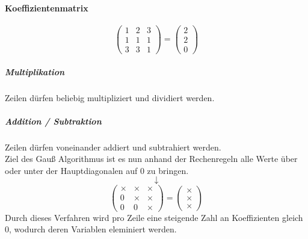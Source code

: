\documentclass{school}
\begin{document}
\paragraph{Koeffizientenmatrix}
$$
\begin{pmatrix}
1 & 2 & 3\\
1 & 1 & 1\\
3 & 3 & 1
\end{pmatrix} =
\begin{pmatrix}
2\\2\\0
\end{pmatrix}
$$
\subparagraph{Multiplikation}
Zeilen dürfen beliebig multipliziert und dividiert werden.
\subparagraph{Addition / Subtraktion}
Zeilen dürfen voneinander addiert und subtrahiert werden.
\vspace{1 em}\\
Ziel des Gauß Algorithmus ist es nun anhand der Rechenregeln alle Werte über oder unter der Hauptdiagonalen auf 0 zu bringen.
$$\downarrow$$
$$
\begin{pmatrix}
\times & \times & \times \\
0 & \times & \times \\
0 & 0 & \times
\end{pmatrix} =
\begin{pmatrix}
\times \\ \times \\ \times
\end{pmatrix}
$$
Durch dieses Verfahren wird pro Zeile eine steigende Zahl an Koeffizienten gleich $0$, wodurch deren Variablen eleminiert werden.
\end{document}
